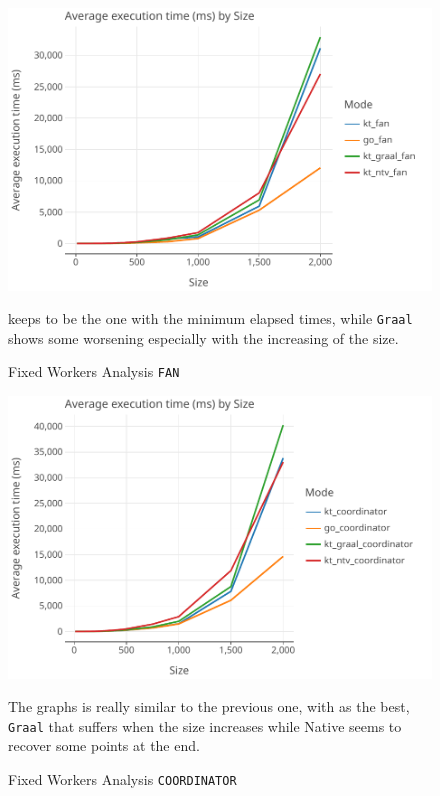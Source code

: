 \begin{figure}[H]
	\centering
	\begin{minipage}{0.7\textwidth}
		\centering
		\includegraphics[width=\textwidth]{img/graphs/fixed_workers_fan}
		\caption{Fixed Workers Analysis \texttt{FAN}}
	\end{minipage}\hfill
	\begin{minipage}{0.25\textwidth}
		\Go keeps to be the one with the minimum elapsed times, while \texttt{Graal} shows some worsening especially with the increasing of the size.
	\end{minipage}
\end{figure}

\begin{figure}[H]
	\centering
	\begin{minipage}{0.7\textwidth}
		\centering
		\includegraphics[width=\textwidth]{img/graphs/fixed_workers_coordinator}
		\caption{Fixed Workers Analysis  \texttt{COORDINATOR}}
	\end{minipage}\hfill
	\begin{minipage}{0.25\textwidth}
		The graphs is really similar to the previous one, with \Go as the best, \texttt{Graal} that suffers when the size increases while \Kotlin Native seems to recover some points at the end.
	\end{minipage}
\end{figure}

